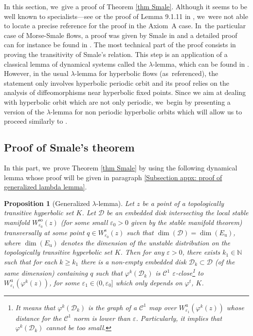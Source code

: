 \documentclass[11pt]{article}
\newcommand{\rs}{\mathrm{s}}
\newcommand{\rso}{\mathrm{so}}
\newcommand{\ru}{\mathrm{u}}
\theoremstyle{definition}
\theoremstyle{plain}
\newtheorem{prop}[definition]{Proposition}
\newcommand{\Ccal}{\mathcal{C}}
\newcommand{\D}{\mathcal{D}}
\newcommand{\N}{\mathbb{N}}
\begin{document}
\begin{appendix}
\label{Appendix: proof of Smale ordering}
In this section, we~give a proof of Theorem \ref{thm Smale}. Although it seems to be well known to specialists---see \cite[p.\,158]{robinson} or the proof of Lemma 9.1.11 in \cite[p.\,536]{FH}, we~were not able to locate a precise reference for the proof in the Axiom~A case. In~the particular case of Morse-Smale flows, a proof was given by Smale in \cite{smale-morse} and a detailed proof can for instance be found in \cite[App.\,B]{DRI}. The most technical part of the proof consists in proving the transitivity of Smale's relation. This step is an application of a classical lemma of dynamical systems called the $\lambda$-lemma, which can be found in \cite[Prop.\,6.1.10, p.\,335]{FH}. However, in the usual $\lambda$-lemma for hyperbolic flows (as~referenced), the statement only involves hyperbolic periodic orbit and its proof relies on the analysis of diffeomorphisms near hyperbolic fixed points. Since we aim at dealing with hyperbolic orbit which are not only periodic, we~begin by presenting a version of the $\lambda$-lemma for non periodic hyperbolic orbits which will allow us to proceed similarly to \cite[App.\,B]{DRI}.

\subsection{Proof of Smale's theorem}

In this part, we~prove Theorem \ref{thm Smale} by using the following dynamical lemma whose proof will be given in paragraph \ref{Subsection appx: proof of generalized lambda lemma}.

\begin{prop}[Generalized $\lambda$-lemma]\label{Prop: lambda lemma for non periodic orbit} Let $z$ be a point of a topologically transitive hyperbolic set $K$. Let $\D$ be an embedded disk intersecting the local stable manifold $W_{\varepsilon_0}^{\rso} (z)$ (for some small $\varepsilon_0 > 0$ given by the stable manifold theorem) transversally at some point $q \in W_{\varepsilon_0}^\rs (z)$ such that $\dim (\D) = \dim(E_\ru)$, where $\dim (E_\ru)$ denotes the dimension of the unstable distribution on the topologically transitive hyperbolic set $K$. Then for any $\varepsilon > 0$, there exists $k_1 \in \N$ such that
for each $k \geq k_1$ there is a non-empty embedded disk $\D_k \subset \D$ (of the same dimension) containing $q$ such that $\varphi^k (\D_k)$ is $\Ccal^1$ $\varepsilon$-close\footnote{It means that $\varphi^k (\D_k)$ is the graph of a $\Ccal^1$ map over $W_{\varepsilon_1}^{\ru} (\varphi^k(z))$ whose distance for the $\Ccal^1$ norm is lower than $\varepsilon$. Particularly, it implies that $\varphi^k (\D_k)$ cannot be too small.} to $W_{\varepsilon_1}^{\ru} (\varphi^k(z))$, for some $\varepsilon_1\in(0,\varepsilon_0]$ which only depends on $\varphi^t$, $K$.
\end{prop}


\end{appendix}
\end{document}
